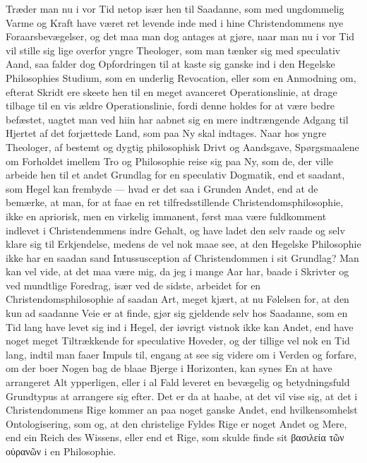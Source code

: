 \documentclass[12pt,a4paper]{book}
\newcommand{\apage}[1]{\marginnote{\footnotesize\textit{[#1]}}}
\begin{document}
Træder man nu i vor Tid netop især hen til Saadanne, som med ungdommelig
Varme og Kraft have været ret levende inde med i hine Christendommens nye
Foraarsbevægelser, og det maa man dog antages at gjøre, naar man nu i vor
Tid vil stille sig lige overfor yngre Theologer, som man tænker sig med
speculativ Aand, saa falder dog Opfordringen til at kaste sig ganske ind i
den Hegelske Philosophies Studium, som en underlig Revocation, eller som en
Anmodning om, efterat Skridt ere skeete hen til en meget avanceret
Operationslinie, at drage tilbage til en vis ældre Operationslinie, fordi
denne holdes for at være bedre befæstet, uagtet man ved hiin har aabnet sig
en mere indtrængende Adgang til Hjertet af det forjættede Land, som paa Ny
skal indtages. Naar hos yngre Theologer, af bestemt og dygtig philosophisk
Drivt og Aandsgave, Spørgsmaalene om Forholdet imellem Tro og Philosophie
reise sig paa Ny, som de, der ville arbeide hen til et andet Grundlag for en
speculativ Dogmatik, end et saadant, som Hegel kan frembyde --- hvad er det
saa i Grunden Andet, end at de bemærke, at man, for at faae en ret
tilfredsstillende Christendomsphilosophie, ikke en apriorisk, men en
\apage{26} virkelig immanent, først maa være fuldkomment indlevet i Christendemmens
indre Gehalt, og have ladet den selv raade og selv klare sig til
Erkjendelse, medens de vel nok maae see, at den Hegelske Philosophie ikke
har en saadan sand Intussusception af Christendommen i sit Grundlag? Man kan
vel vide, at det maa være mig, da jeg i mange Aar har, baade i Skrivter og
ved mundtlige Foredrag, især ved de sidste, arbeidet for en
Christendomsphilosophie af saadan Art, meget kjært, at nu Følelsen for, at
den kun ad saadanne Veie er at finde, gjør sig gjeldende selv hos Saadanne,
som en Tid lang have levet sig ind i Hegel, der iøvrigt vistnok ikke kan
Andet, end have noget meget Tiltrækkende for speculative Hoveder, og der
tillige vel nok en Tid lang, indtil man faaer Impuls til, engang at see sig
videre om i Verden og forfare, om der boer Nogen bag de blaae Bjerge i
Horizonten, kan synes En at have arrangeret Alt ypperligen, eller i al Fald
leveret en bevægelig og betydningsfuld Grundtypus at arrangere sig efter.
Det er da at haabe, at det vil vise sig, at det i Christendommens Rige
kommer an paa noget ganske Andet, end hvilkensomhelst Ontologisering, som
og, at den christelige Fyldes Rige er noget Andet og Mere, end ein Reich des
Wissens, eller end et Rige, som skulde finde sit βασιλεία τῶν οὐρανῶν i en
Philosophie.
\end{document}
